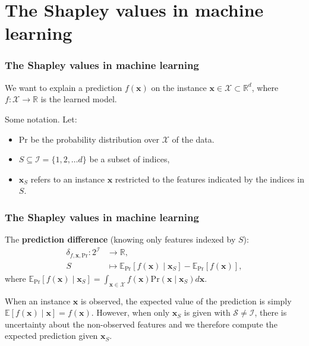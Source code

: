 \documentclass{beamer}
\begin{document}
\section{The Shapley values in machine learning}


\begin{frame}
\frametitle{The Shapley values in machine learning}

We want to explain a prediction $f(\bm{x})$ on the instance $\bm{x}\in\mathcal{X}\subset\mathbb{R}^d$, where $f:\mathcal{X}\to\mathbb{R}$ is the learned model.
\begin{figure}
  \centering
    \end{figure}

\pause
Some notation. Let:
\begin{itemize}
\item $\text{Pr}$ be the probability distribution over $\mathcal{X}$ of the data.
\pause
\item $S\subseteq \mathcal{I}=\{1,2,\dots d\}$ be a subset of indices,
\pause
\item $\bm{x}_S$ refers to an instance $\bm{x}$ restricted to the features indicated by the indices in $S$.
\end{itemize}

\end{frame}

\begin{frame}
  \frametitle{The Shapley values in machine learning}
The \textbf{prediction difference} (knowing only features indexed by $S$):
\begin{equation}
  \begin{aligned}
    \delta_{f,\bm{x},\text{Pr}}: 2^{\mathcal{I}} &\to \mathbb{R},\\
    S &\mapsto \mathbb{E}_\text{Pr}[f(\bm{x})\mid \bm{x}_S] - \mathbb{E}_\text{Pr}[f(\bm{x})],
  \end{aligned}
\end{equation}
where $\mathbb{E}_{\text{Pr}}[f(\bm{x}) \mid \bm{x}_S] = \int_{\bm{x} \in \mathcal{X}}f(\bm{x})\text{Pr}(\bm{x} \mid \bm{x}_S)d\bm{x}$.
\vspace{1cm}

When an instance $\bm{x}$ is observed, the expected value of the prediction is simply $\mathbb{E}[f(\bm{x}) \mid \bm{x}] = f(\bm{x})$. However, when only $\bm{x}_S$ is given with $\mathcal{S} \neq \mathcal{I}$, there is uncertainty about the non-observed features and we therefore compute the expected prediction given $\bm{x}_S$.
\end{frame}
\end{document}

